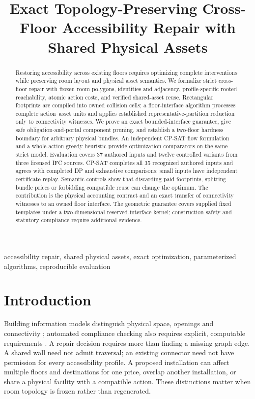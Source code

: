 \documentclass[conference]{IEEEtran}
\title{Exact Topology-Preserving Cross-Floor Accessibility Repair with Shared Physical Assets}
\author{}
\begin{document}
\maketitle
\begin{abstract}
Restoring accessibility across existing floors requires optimizing complete interventions while preserving room layout and physical asset semantics. We formalize strict cross-floor repair with frozen room polygons, identities and adjacency, profile-specific rooted reachability, atomic action costs, and verified shared-asset reuse. Rectangular footprints are compiled into owned collision cells; a floor-interface algorithm processes complete action--asset units and applies established representative-partition reduction only to connectivity witnesses. We prove an exact bounded-interface guarantee, give safe obligation-and-portal component pruning, and establish a two-floor hardness boundary for arbitrary physical bundles. An independent CP-SAT flow formulation and a whole-action greedy heuristic provide optimization comparators on the same strict model. Evaluation covers 37 authored inputs and twelve controlled variants from three licensed IFC sources. CP-SAT completes all 35 recognized authored inputs and agrees with completed DP and exhaustive comparisons; small inputs have independent certificate replay. Semantic controls show that discarding paid footprints, splitting bundle prices or forbidding compatible reuse can change the optimum. The contribution is the physical accounting contract and an exact transfer of connectivity witnesses to an owned floor interface. The geometric guarantee covers supplied fixed templates under a two-dimensional reserved-interface kernel; construction safety and statutory compliance require additional evidence.
\end{abstract}
\begin{IEEEkeywords}
accessibility repair, shared physical assets, exact optimization, parameterized algorithms, reproducible evaluation
\end{IEEEkeywords}

\section{Introduction}
Building information models distinguish physical space, openings and connectivity \cite{bim,ava}; automated compliance checking also requires explicit, computable requirements \cite{amor}. A repair decision requires more than finding a missing graph edge. A shared wall need not admit traversal; an existing connector need not have permission for every accessibility profile. A proposed installation can affect multiple floors and destinations for one price, overlap another installation, or share a physical facility with a compatible action. These distinctions matter when room topology is frozen rather than regenerated.
\end{document}

